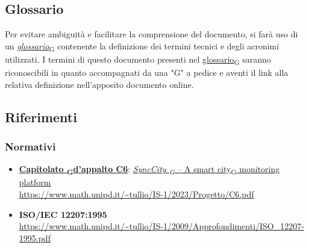\subsection{Glossario}
Per evitare ambiguità e facilitare la comprensione del documento, si farà uso di un \href{https://7last.github.io/docs/rtb/documentazione-interna/glossario\#glossario}{\textit{glossario}\textsubscript{G}} contenente la definizione dei termini tecnici e degli acronimi utilizzati. I termini di questo documento presenti nel \href{https://7last.github.io/docs/rtb/documentazione-interna/glossario\#glossario}{glossario\textsubscript{G}} saranno riconoscibili in quanto accompagnati da una "G" a pedice e aventi il link alla relativa definizione nell'apposito documento online.

\subsection{Riferimenti}
\subsubsection{Normativi}
\begin{itemize}
	\item \href{https://7last.github.io/docs/rtb/documentazione-interna/glossario\#capitolato}{\textbf{Capitolato \textsubscript{G}d'appalto C6}}: \href{https://7last.github.io/docs/rtb/documentazione-interna/glossario\#synccity}{\textit{SyncCity \textsubscript{G}} – A \href{https://7last.github.io/docs/rtb/documentazione-interna/glossario\#smart-city}{smart city\textsubscript{G}} monitoring platform}\\
    \url{https://www.math.unipd.it/~tullio/IS-1/2023/Progetto/C6.pdf}
	\item \textbf{ISO/IEC 12207:1995} \\ \url{https://www.math.unipd.it/~tullio/IS-1/2009/Approfondimenti/ISO_12207-1995.pdf}
\end{itemize}

